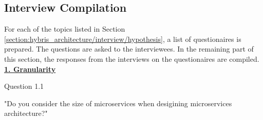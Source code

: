 \subsection{Interview Compilation}\label{section:hybris_architecture/interview/interview_compilation}
For each of the topics listed in Section \ref{section:hybris_architecture/interview/hypothesis}, a list of questionaires is prepared. The questions are asked to the interviewees. In the remaining part of this section, the responses from the interviews on the questionaires are compiled.
\\
\textbf{\underline{1. Granularity}}\\  
\begin{shaded} Question 1.1 \end{shaded} \label{question:hybris_architecture/interview/question_1.1}
"Do you consider the size of microservices when desigining microservices architecture?"\\

